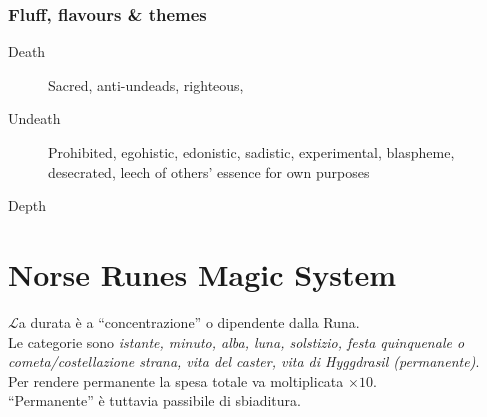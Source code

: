 \documentclass[10pt,a4paper]{article}
\begin{document}
\subsubsection{Fluff, flavours \& themes}
\begin{description}
\item[Death] Sacred, anti-undeads, righteous,  
\item[Undeath] Prohibited, egohistic, edonistic, sadistic, experimental, blaspheme, desecrated, leech of others' essence for own 
purposes
\item[Depth] 
\end{description}



\section{Norse Runes Magic System}
$\mathcal{L}$a durata \`{e} a ``concentrazione'' o dipendente dalla Runa.\\ Le categorie sono \textit{istante, minuto, alba, luna, solstizio, festa quinquenale o cometa/costellazione strana, vita del caster, vita di Hyggdrasil (permanente)}.\\
Per rendere permanente la spesa totale va moltiplicata $\times10$. \\
``Permanente'' \`{e} tuttavia passibile di sbiaditura.
\end{document}
